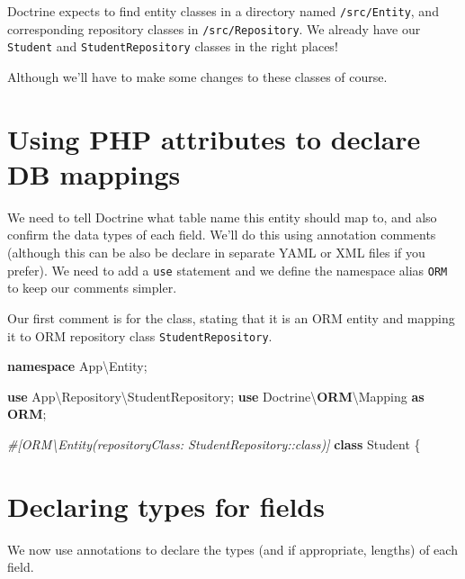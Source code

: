 \documentclass[a4paperpaper,openright]{book}
\newenvironment{Shaded}{}{}
\newcommand{\CommentTok}[1]{\textcolor[rgb]{0.38,0.63,0.69}{\textit{#1}}}
\newcommand{\KeywordTok}[1]{\textcolor[rgb]{0.00,0.44,0.13}{\textbf{#1}}}
\newcommand{\NormalTok}[1]{#1}
\newcommand{\OtherTok}[1]{\textcolor[rgb]{0.00,0.44,0.13}{#1}}
\begin{document}
Doctrine expects to find entity classes in a directory named
\texttt{/src/Entity}, and corresponding repository classes in
\texttt{/src/Repository}. We already have our \texttt{Student} and
\texttt{StudentRepository} classes in the right places!

Although we'll have to make some changes to these classes of course.

\hypertarget{using-php-attributes-to-declare-db-mappings}{%
\section{Using PHP attributes to declare DB
mappings}\label{using-php-attributes-to-declare-db-mappings}}

We need to tell Doctrine what table name this entity should map to, and
also confirm the data types of each field. We'll do this using
annotation comments (although this can be also be declare in separate
YAML or XML files if you prefer). We need to add a \texttt{use}
statement and we define the namespace alias \texttt{ORM} to keep our
comments simpler.

Our first comment is for the class, stating that it is an ORM entity and
mapping it to ORM repository class \texttt{StudentRepository}.

\begin{Shaded}
\begin{Highlighting}[]
    \KeywordTok{namespace}\NormalTok{ App\textbackslash{}Entity}\OtherTok{;}

    \KeywordTok{use}\NormalTok{ App\textbackslash{}Repository\textbackslash{}StudentRepository}\OtherTok{;}
    \KeywordTok{use}\NormalTok{ Doctrine\textbackslash{}}\KeywordTok{ORM}\NormalTok{\textbackslash{}Mapping }\KeywordTok{as} \KeywordTok{ORM}\OtherTok{;}

    \CommentTok{#[ORM\textbackslash{}Entity(repositoryClass: StudentRepository::class)]}
    \KeywordTok{class}\NormalTok{ Student}
\NormalTok{    \{}
\end{Highlighting}
\end{Shaded}

\hypertarget{declaring-types-for-fields}{%
\section{Declaring types for fields}\label{declaring-types-for-fields}}

We now use annotations to declare the types (and if appropriate,
lengths) of each field.
\end{document}
